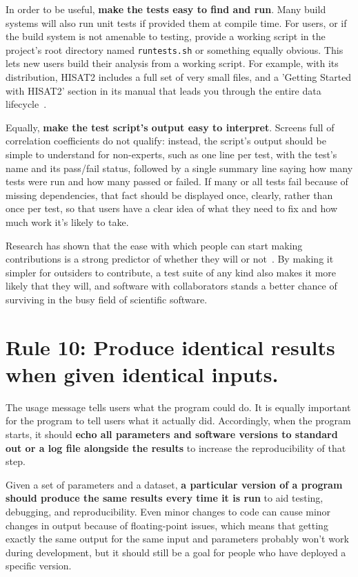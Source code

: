 \documentclass[10pt,letterpaper]{article}
\newcommand{\rulemajor}[1]{\section{#1}}
\newcommand{\ruleminor}[1]{\textbf{#1}}
\begin{document}
In order to be useful, \ruleminor{make the tests easy to find and
run}.  Many build systems will also run unit tests if provided them
at compile time.  For users, or if the build system is not amenable to
testing, provide a working script in the project's root directory
named \texttt{runtests.sh} or something equally obvious.  This lets
new users build their analysis from a working script.  For example,
with its distribution, HISAT2 includes a full set of very small files,
and a 'Getting Started with HISAT2' section in its manual that leads
you through the entire data lifecycle~\cite{pertea2016}.

Equally, \ruleminor{make the test script's output easy to
interpret}. Screens full of correlation coefficients do not qualify:
instead, the script's output should be simple to understand for
non-experts, such as one line per test, with the test's name and its
pass/fail status, followed by a single summary line saying how many
tests were run and how many passed or failed. If many or all tests
fail because of missing dependencies, that fact should be displayed
once, clearly, rather than once per test, so that users have a clear
idea of what they need to fix and how much work it's likely to take.

Research has shown that the ease with which people can start making
contributions is a strong predictor of whether they will or
not~\cite{steinmacher2015}.  By making it simpler for outsiders to
contribute, a test suite of any kind also makes it more likely that
they will, and software with collaborators stands a better chance of
surviving in the busy field of scientific software.

\rulemajor{Rule 10: Produce identical results when given identical inputs.}

The usage message tells users what the program could do.  It is
equally important for the program to tell users what it actually did.
Accordingly, when the program starts, it should \ruleminor{echo all
parameters and software versions to standard out or a log file
alongside the results} to increase the reproducibility of that step.

Given a set of parameters and a dataset, \ruleminor{a particular
version of a program should produce the same results every time it
is run} to aid testing, debugging, and reproducibility.  Even minor
changes to code can cause minor changes in output because of
floating-point issues, which means that getting exactly the same
output for the same input and parameters probably won't work during
development, but it should still be a goal for people who have
deployed a specific version.
\end{document}
